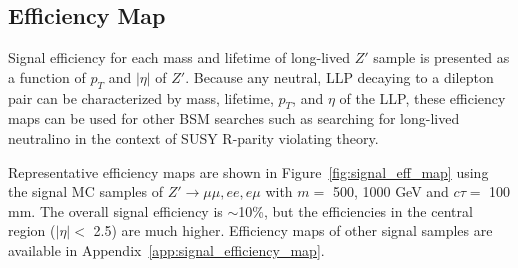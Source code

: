 \subsection{Efficiency Map}
\label{sec:efficiency_map}
Signal efficiency for each mass and lifetime of long-lived $Z'$ sample is presented as a function of $p_{T}$ and $|\eta|$ of $Z'$. Because any neutral, LLP decaying to a dilepton pair can be characterized by mass, lifetime, $p_{T}$, and $\eta$ of the LLP, these efficiency maps can be used for other BSM searches such as searching for long-lived neutralino in the context of SUSY R-parity violating theory.

Representative efficiency maps are shown in Figure~\ref{fig:signal_eff_map} using the signal MC samples of $Z' \rightarrow \mu\mu, ee, e\mu$ with $m=$ 500, 1000 GeV and $c\tau=$ 100 mm. The overall signal efficiency is $\sim$10\%, but the efficiencies in the central region ($|\eta| < $ 2.5) are much higher. Efficiency maps of other signal samples are available in Appendix~\ref{app:signal_efficiency_map}.

